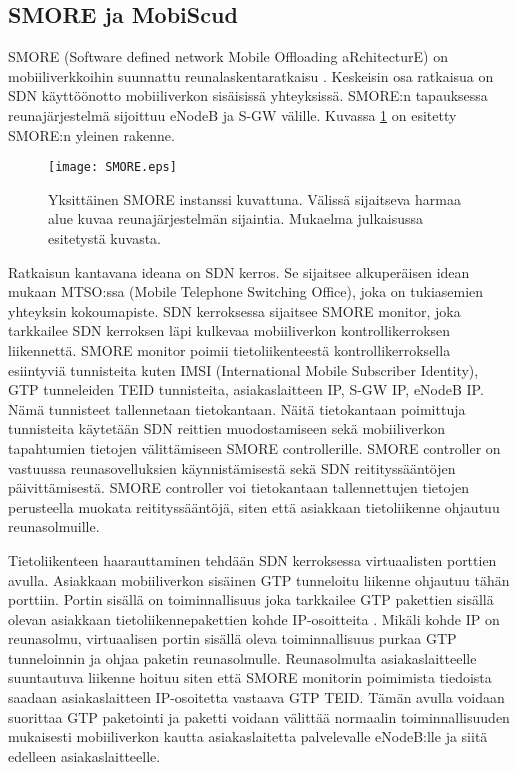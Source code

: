 
\subsection{SMORE ja MobiScud} \label{smore}
SMORE (Software defined network Mobile Offloading aRchitecturE) on mobiiliverkkoihin suunnattu reunalaskentaratkaisu \cite{cho2014smore}.
Keskeisin osa ratkaisua on SDN käyttöönotto mobiiliverkon sisäisissä yhteyksissä.
SMORE:n tapauksessa reunajärjestelmä sijoittuu eNodeB ja S-GW välille. Kuvassa \ref{fig:smore} on esitetty SMORE:n yleinen rakenne.

\begin{figure}[tb]
\texttt{[image: SMORE.eps]}
\caption{Yksittäinen SMORE instanssi kuvattuna. Välissä sijaitseva harmaa alue kuvaa reunajärjestelmän sijaintia. Mukaelma julkaisussa \cite{cho2014smore} esitetystä kuvasta.} \label{fig:smore}
\end{figure}


Ratkaisun kantavana ideana on SDN kerros. Se sijaitsee alkuperäisen idean mukaan MTSO:ssa (Mobile Telephone Switching Office), joka on tukiasemien yhteyksin kokoumapiste.
SDN kerroksessa sijaitsee SMORE monitor, joka tarkkailee SDN kerroksen läpi kulkevaa mobiiliverkon kontrollikerroksen liikennettä. SMORE monitor poimii tietoliikenteestä kontrollikerroksella esiintyviä tunnisteita kuten IMSI (International Mobile Subscriber Identity), GTP tunneleiden TEID tunnisteita, asiakaslaitteen IP, S-GW IP, eNodeB IP. Nämä tunnisteet tallennetaan tietokantaan.
Näitä tietokantaan poimittuja tunnisteita käytetään SDN reittien muodostamiseen sekä mobiiliverkon tapahtumien tietojen välittämiseen SMORE controllerille.
SMORE controller on vastuussa reunasovelluksien käynnistämisestä sekä SDN reitityssääntöjen päivittämisestä. SMORE controller voi tietokantaan tallennettujen tietojen perusteella muokata reitityssääntöjä, siten että asiakkaan tietoliikenne ohjautuu reunasolmuille. 

Tietoliikenteen haarauttaminen tehdään SDN kerroksessa virtuaalisten porttien avulla.
Asiakkaan mobiiliverkon sisäinen GTP tunneloitu liikenne ohjautuu tähän porttiin.
Portin sisällä on toiminnallisuus joka tarkkailee GTP pakettien sisällä olevan asiakkaan tietoliikennepakettien kohde IP-osoitteita \cite{cho2014smore}.
Mikäli kohde IP on reunasolmu, virtuaalisen portin sisällä oleva toiminnallisuus purkaa GTP tunneloinnin ja ohjaa paketin reunasolmulle.
Reunasolmulta asiakaslaitteelle suuntautuva liikenne hoituu siten että SMORE monitorin poimimista tiedoista saadaan asiakaslaitteen IP-osoitetta vastaava GTP TEID.
Tämän avulla voidaan suorittaa GTP paketointi ja paketti voidaan välittää normaalin toiminnallisuuden mukaisesti mobiiliverkon kautta asiakaslaitetta palvelevalle eNodeB:lle ja siitä edelleen asiakaslaitteelle. 


